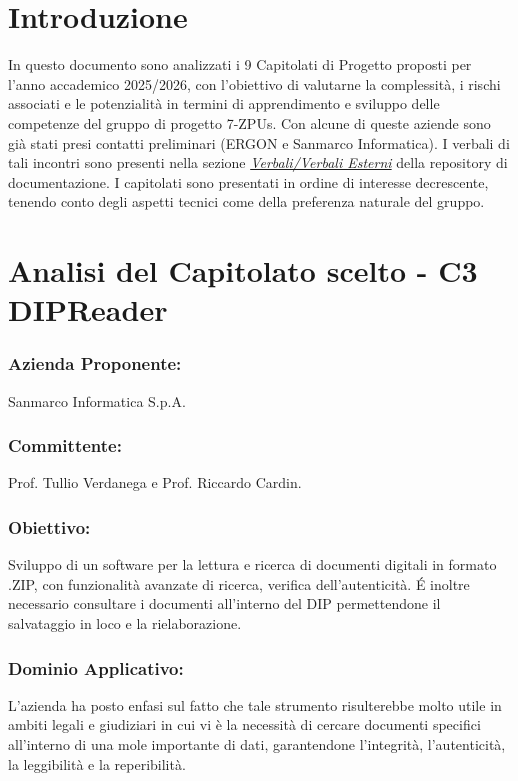 \documentclass[a4paper,12pt]{article}
\begin{document}
\section{Introduzione}
In questo documento sono analizzati i 9 Capitolati di Progetto proposti per
l'anno accademico 2025/2026, con l'obiettivo di valutarne la complessità, i
rischi associati e le potenzialità in termini di apprendimento e sviluppo delle
competenze del gruppo di progetto 7-ZPUs. Con alcune di queste aziende sono già
stati presi contatti preliminari (ERGON e Sanmarco Informatica). I verbali di
tali incontri sono presenti nella sezione \href{https://github.com/7-ZPUs/Docs/tree/main/1_Candidatura/Verbali/Verbali\%20Esterni}{\textit{Verbali/Verbali Esterni}}
della repository di documentazione. \vspace{0.5cm}
I capitolati sono presentati in ordine di interesse decrescente, tenendo conto
degli aspetti tecnici come della preferenza naturale del gruppo.

\section{Analisi del Capitolato scelto - C3 DIPReader}
\subsubsection*{Azienda Proponente:} Sanmarco Informatica S.p.A.
\subsubsection*{Committente:} Prof. Tullio Verdanega e Prof. Riccardo Cardin.
\subsubsection*{Obiettivo:} Sviluppo di un software per la lettura e ricerca di documenti digitali in formato .ZIP, con funzionalità avanzate di ricerca, verifica dell'autenticità. É inoltre necessario consultare i documenti all'interno del DIP permettendone il salvataggio in loco e la rielaborazione.
\subsubsection*{Dominio Applicativo:} L'azienda ha posto enfasi sul fatto che tale strumento risulterebbe molto utile in ambiti legali e giudiziari in cui vi è la necessità di cercare documenti specifici all'interno di una mole importante di dati, garantendone l'integrità, l'autenticità, la leggibilità  e la reperibilità.
\end{document}
